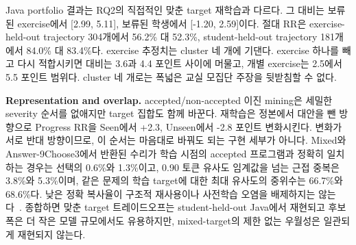 \documentclass[10pt,conference]{IEEEtran}
\begin{document}
Java portfolio 결과는 RQ2의 직접적인 맞춘 target 재학습과 다르다. 그 대비는 보류된 exercise에서 [2.99, 5.11], 보류된 학생에서 [-1.20, 2.59]이다. 절대 RR은 exercise-held-out trajectory 304개에서 56.2\% 대 52.3\%, student-held-out trajectory 181개에서 84.0\% 대 83.4\%다. exercise 추정치는 cluster 네 개에 기댄다. exercise 하나를 빼고 다시 적합시키면 대비는 3.6과 4.4 포인트 사이에 머물고, 개별 exercise는 2.5에서 5.5 포인트 범위다. cluster 네 개로는 폭넓은 교실 모집단 주장을 뒷받침할 수 없다.

\noindent\textbf{Representation and overlap.} accepted/non-accepted 이진 mining은 세밀한 severity 순서를 없애지만 target 집합도 함께 바꾼다. 재학습은 정본에서 대안을 뺀 방향으로 Progress RR을 Seen에서 +2.3, Unseen에서 -2.8 포인트 변화시킨다. 변화가 서로 반대 방향이므로, 이 순서는 마음대로 바꿔도 되는 구현 세부가 아니다. Mixed와 Answer-9Choose3에서 반환된 수리가 학습 시점의 accepted 프로그램과 정확히 일치하는 경우는 선택의 0.6\%와 1.3\%이고, 0.90 토큰 유사도 임계값을 넘는 근접 중복은 3.8\%와 5.3\%이며, 같은 문제의 학습 target에 대한 최대 유사도의 중위수는 66.7\%와 68.6\%다. 낮은 정확 복사율이 구조적 재사용이나 사전학습 오염을 배제하지는 않는다~\cite{allamanis2019adverse}. 종합하면 맞춘 target 트레이드오프는 student-held-out Java에서 재현되고 후보 폭은 더 작은 모델 규모에서도 유용하지만, mixed-target의 제한 없는 우월성은 일관되게 재현되지 않는다.
\end{document}
